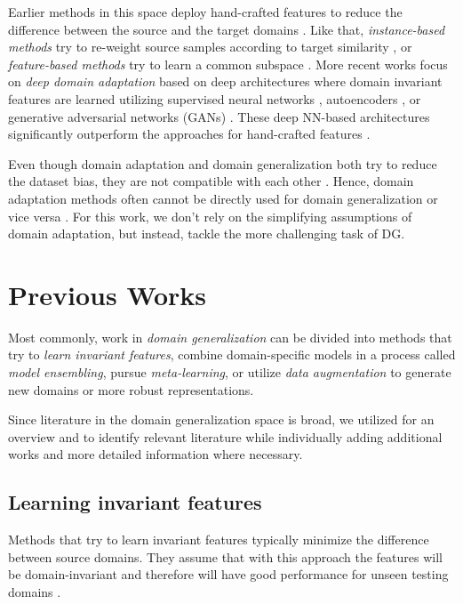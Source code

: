 Earlier methods in this space deploy hand-crafted features to reduce the difference between the source and the target domains \citep{ManciniPBC018}. Like that, \emph{instance-based methods} try to re-weight source samples according to target similarity \citep{GongGS13, HuangSGBS06, YamadaSR12}, or \emph{feature-based methods} try to learn a common subspace \citep{FernandoHST13, GongSSG12, LongD0SGY13, BaktashmotlaghHLS13}. More recent works focus on \emph{deep domain adaptation} based on deep architectures where domain invariant features are learned utilizing supervised neural networks \citep{BousmalisTSKE16, CarlucciPCRB17, GaninL15, GhifaryKZBL16}, autoencoders \citep{ZengOWW14}, or generative adversarial networks (GANs) \citep{BousmalisSDEK17, ShrivastavaPTSW17, TzengHSD17}. These deep NN-based architectures significantly outperform the approaches for hand-crafted features \citep{ManciniPBC018}.

Even though domain adaptation and domain generalization both try to reduce the dataset bias, they are not compatible with each other \citep{GhifaryBKZ17}. Hence, domain adaptation methods often cannot be directly used for domain generalization or vice versa \citep{GhifaryBKZ17}. For this work, we don't rely on the simplifying assumptions of domain adaptation, but instead, tackle the more challenging task of DG.

\section{Previous Works}

Most commonly, work in \emph{domain generalization} can be divided into methods that try to \emph{learn invariant features}, combine domain-specific models in a process called \emph{model ensembling}, pursue \emph{meta-learning}, or utilize \emph{data augmentation} to generate new domains or more robust representations.

Since literature in the domain generalization space is broad, we utilized \citet[Appendix A]{gulrajani2020search} for an overview and to identify relevant literature while individually adding additional works and more detailed information where necessary.  

\subsection{Learning invariant features}
\label{sec:invariant_features}

Methods that try to learn invariant features typically minimize the difference between source domains. They assume that with this approach the features will be domain-invariant and therefore will have good performance for unseen testing domains \citep{huang2020selfchallenging}.

